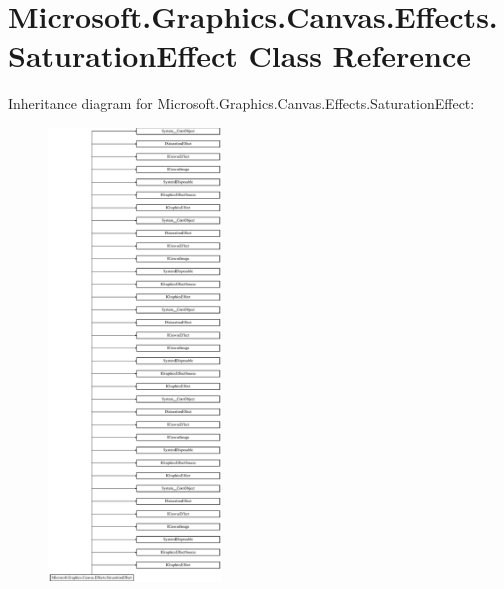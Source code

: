 \hypertarget{class_microsoft_1_1_graphics_1_1_canvas_1_1_effects_1_1_saturation_effect}{}\section{Microsoft.\+Graphics.\+Canvas.\+Effects.\+Saturation\+Effect Class Reference}
\label{class_microsoft_1_1_graphics_1_1_canvas_1_1_effects_1_1_saturation_effect}
Inheritance diagram for Microsoft.\+Graphics.\+Canvas.\+Effects.\+Saturation\+Effect\+:\begin{figure}[H]
\begin{center}
\leavevmode
\includegraphics[height=12.000000cm]{class_microsoft_1_1_graphics_1_1_canvas_1_1_effects_1_1_saturation_effect}
\end{center}
\end{figure}
